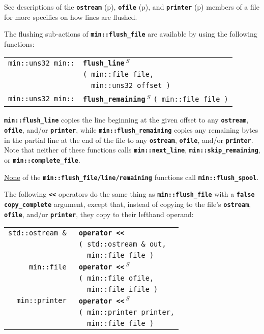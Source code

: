 \documentclass[12pt]{article}
\makeatletter
\newcommand{\TT}[1]{{\tt \bfseries #1}}
\newcommand{\ttindex}[1]{\index{#1@{\tt #1}}}
\newcommand{\ttomkey}[3]{\TT{operator #2}\index{#1@{\tt operator #2}!{#3}}}
\newcommand{\pagref}[1]{p\pageref{#1}}
\newcommand{\EOL}{\penalty \exhyphenpenalty}
\newenvironment{indpar}[1][0.3in]%
	{\begin{list}{}%
		     {\setlength{\itemsep}{0in}%
		      \setlength{\topsep}{0in}%
		      \setlength{\parsep}{1ex}%
		      \setlength{\labelwidth}{#1}%
		      \setlength{\leftmargin}{#1}%
		      \addtolength{\leftmargin}{\labelsep}}%
	 \item}%
	{\end{list}}
\newcommand{\LABEL}[1]{\label{#1}}
\newlength{\ARGBREAKLENGTH}
\newcommand{\ARGBREAK}[1][\ARGBREAKLENGTH]{\\&\hspace*{#1}}
\newcommand{\TTOMKEY}[3]{\ttomkey{#1}{#2}{#3}}
\newcommand{\MINKEY}[1]%
	   {\TT{#1}\ttindex{min::#1}\ttindex{#1}}
\newcommand{\RESIZE}{$\,^S$}
\makeatother
\begin{document}
See descriptions of the \TT{ostream} (\pagref{OSTREAM_OF_FILE}),
\TT{ofile} (\pagref{OFILE_OF_FILE}),
and \TT{printer} (\pagref{PRINTER_OF_FILE}) members of a file for more
specifics on how lines are flushed.

The flushing sub-actions of \TT{min::flush\_file} are available by using
the following functions:

\begin{indpar}[1em]\begin{tabular}{r@{}l}
\verb|min::uns32 min::|
    & \MINKEY{flush\_\EOL line\RESIZE}\ARGBREAK
          \verb|( min::file file,|\ARGBREAK
	  \verb|  min::uns32 offset )|
\LABEL{MIN::FLUSH_LINE} \\
\verb|min::uns32 min::|
    & \MINKEY{flush\_remaining\RESIZE} \verb|( min::file file )|
\LABEL{MIN::FLUSH_REMAINING} \\
\end{tabular}\end{indpar}

\TT{min::flush\_line} copies the line beginning at the given offset
to any \TT{ostream}, \TT{ofile},
and/or \TT{printer},
while \TT{min::\EOL flush\_\EOL remaining} copies any remaining
bytes in the partial line
at the end of the file
to any \TT{ostream}, \TT{ofile}, and/or
\TT{printer}.
Note that neither of these functions calls \TT{min::\EOL next\_\EOL line},
\TT{min::\EOL skip\_\EOL remaining}, or \TT{min::\EOL complete\_\EOL file}.

\underline{None} of
the \TT{min::\EOL flush\_file/\EOL line/\EOL remaining}
functions call \TT{min::\EOL flush\_\EOL spool}.

The following \TT{<{}<} operators do the same thing as
\TT{min::\EOL flush\_\EOL file} with a \TT{false} \TT{copy\_\EOL complete}
argument, except that, instead of copying
to the file's \TT{ostream}, \TT{ofile}, and/or
\TT{printer}, they copy to their lefthand operand:

\begin{indpar}[1em]\begin{tabular}{r@{}l}
\verb|std::ostream & |
    & \TTOMKEY{<<}{<{}<}%
              {of {\tt min::file}}\ARGBREAK
      \verb|( std::ostream & out,|\ARGBREAK
      \verb|  min::file file )|
\LABEL{OSTREAM_OPERATOR<<_OF_FILE} \\
\verb|min::file |
    & \TTOMKEY{<<}{<{}<\RESIZE}%
              {of {\tt min::file}}\ARGBREAK
      \verb|( min::file ofile,|\ARGBREAK
      \verb|  min::file ifile )|
\LABEL{FILE_OPERATOR<<_OF_FILE} \\
\verb|min::printer |
    & \TTOMKEY{<<}{<{}<\RESIZE}%
              {of {\tt min::file}}\ARGBREAK
      \verb|( min::printer printer,|\ARGBREAK
      \verb|  min::file file )|
\LABEL{PRINTER_OPERATOR<<_OF_FILE} \\
\end{tabular}\end{indpar}
\end{document}
